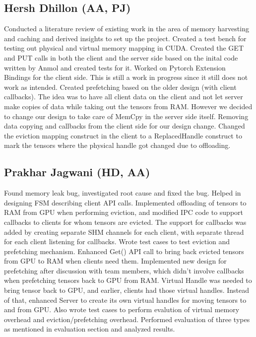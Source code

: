 \documentclass{article}
\begin{document}
\subsection{Hersh Dhillon (AA, PJ)}
Conducted a literature review of existing work in the area of memory harvesting and caching and derived insights to set up the project.
Created a test bench for testing out physical and virtual memory mapping in CUDA.
Created the GET and PUT calls in both the client and the server side based on the inital code written by Anmol and created tests for it.
Worked on Pytorch Extension Bindings for the client side. This is still a work in progress since it still does not work as intended.
Created prefetching based on the older design (with client callbacks). The idea was to have all client data on the client and not let server make copies of data while taking out the tensors from RAM. However we decided to change our design to take care of MemCpy in the server side itself.
Removing data copying and callbacks from the client side for our design change. Changed the eviction mapping construct in the client to a ReplacedHandle construct to mark the tensors where the physical handle got changed due to offloading.

\subsection{Prakhar Jagwani (HD, AA)}
Found memory leak bug, investigated root cause and fixed the bug.
Helped in designing FSM describing client API calls. 
Implemented offloading of tensors to RAM from GPU when performing eviction, and modified
IPC code to support callbacks to clients for whom tensors are evicted. The support for callbacks
was added by creating separate SHM channels for each client, with separate thread for each client listening for callbacks.
Wrote test cases to test eviction and prefetching mechanism.
Enhanced Get() API call to bring back evicted tensors from GPU to RAM when clients need them.
Implemented new design for prefetching after discussion with team members, which didn't
involve callbacks when prefetching tensors back to GPU from RAM. Virtual Handle was needed to
bring tensor back to GPU, and earlier, clients had those virtual handles. Instead of that, enhanced
Server to create its own virtual handles for moving tensors to and from GPU.
Also wrote test cases to perform evalution of virtual memory overhead and eviction/prefetching overhead.
Performed evaluation of three types as mentioned in evaluation section and analyzed results.
\end{document}

